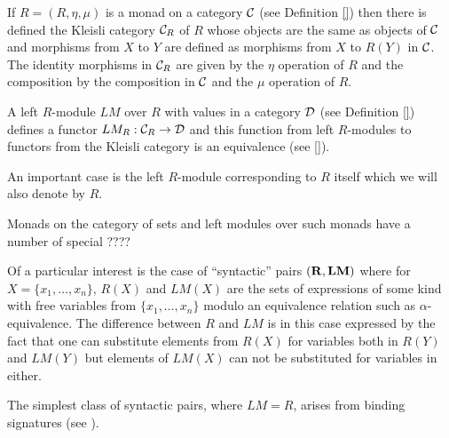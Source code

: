 \documentclass[11pt]{article}
\newcommand{\sr}{\rightarrow}
\newcommand{\rr}{{\bf R}}
\newcommand{\lm}{{\bf LM}}
\begin{document}
If $R=(R,\eta,\mu)$ is a monad on a category $\cal C$ (see Definition \ref{}) then there is defined the Kleisli category ${\cal C}_R$ of $R$ whose objects are the same as objects of $\cal C$ and morphisms from $X$ to $Y$ are defined as morphisms from $X$ to $R(Y)$ in $\cal C$. The identity morphisms in ${\cal C}_R$ are given by the $\eta$ operation of $R$ and the composition by the composition in $\cal C$ and the $\mu$ operation of $R$.

A left $R$-module $LM$  over $R$ with values in a category $\cal D$ (see Definition \ref{}) defines a functor $LM_R:{\cal C}_R\sr {\cal D}$ and this function from left $R$-modules to functors from the Kleisli category is an equivalence (see \ref{}). 

An important case is the left $R$-module corresponding to $R$ itself which we will also denote by $R$.   

Monads on the category of sets and left modules over such monads have a number of special ????


Of a particular interest is the case of ``syntactic'' pairs $(\rr,\lm)$ where for $X=\{x_1,\dots,x_n\}$, $R(X)$ and $LM(X)$ are the sets of expressions of some kind with free variables from $\{x_1,\dots,x_n\}$ modulo an equivalence relation such as $\alpha$-equivalence. The difference between $R$ and $LM$ is in this case expressed by the fact that one can substitute elements from $R(X)$ for variables both in $R(Y)$ and $LM(Y)$ but elements of $LM(X)$ can not be substituted for variables in either. 

The simplest class of syntactic pairs, where $LM=R$, arises from binding signatures (see \cite[p.228]{HM2007}). 
\end{document}
